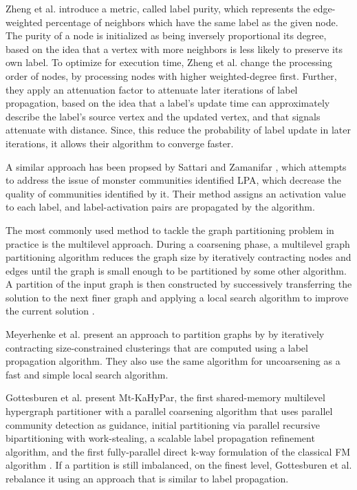 {Zheng et al. \cite{zheng2018improved} introduce a metric, called label purity, which represents the edge-weighted percentage of neighbors which have the same label as the given node. The purity of a node is initialized as being inversely proportional its degree, based on the idea that a vertex with more neighbors is less likely to preserve its own label. To optimize for execution time, Zheng et al. change the processing order of nodes, by processing nodes with higher weighted-degree first. Further, they apply an attenuation factor to attenuate later iterations of label propagation, based on the idea that a label's update time can approximately describe the label's source vertex and the updated vertex, and that signals attenuate with distance. Since, this reduce the probability of label update in later iterations, it allows their algorithm to converge faster.

A similar approach has been propsed by Sattari and Zamanifar \cite{sattari2018spreading}, which attempts to address the issue of monster communities identified LPA, which decrease the quality of communities identified by it. Their method assigns an activation value to each label, and label-activation pairs are propagated by the algorithm.

The most commonly used method to tackle the graph partitioning problem in practice is the multilevel approach. During a coarsening phase, a multilevel graph partitioning algorithm reduces the graph size by iteratively contracting nodes and edges until the graph is small enough to be partitioned by some other algorithm. A partition of the input graph is then constructed by successively transferring the solution to the next finer graph and applying a local search algorithm to improve the current solution \cite{meyerhenke2014partitioning}.

Meyerhenke et al. \cite{meyerhenke2014partitioning} present an approach to partition graphs by by iteratively contracting size-constrained clusterings that are computed using a label propagation algorithm. They also use the same algorithm for uncoarsening as a fast and simple local search algorithm.

Gottesburen et al. \cite{gottesburen2021scalable} present Mt-KaHyPar, the first shared-memory multilevel hypergraph partitioner with a parallel coarsening algorithm that uses parallel community detection as guidance, initial partitioning via parallel recursive bipartitioning with work-stealing, a scalable label propagation refinement algorithm, and the first fully-parallel direct k-way formulation of the classical FM algorithm \cite{fiduccia1988linear}.  If a partition is still imbalanced, on the finest level, Gottesburen et al. rebalance it using an approach that is similar to label propagation.

}
